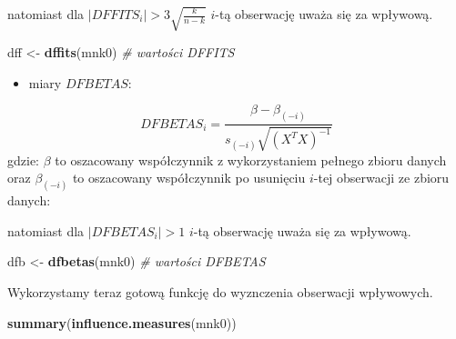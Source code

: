 \documentclass[polish,]{book}
\newenvironment{Shaded}{\begin{snugshade}}{\end{snugshade}}
\newcommand{\CommentTok}[1]{\textcolor[rgb]{0.56,0.35,0.01}{\textit{#1}}}
\newcommand{\KeywordTok}[1]{\textcolor[rgb]{0.13,0.29,0.53}{\textbf{#1}}}
\newcommand{\NormalTok}[1]{#1}
\newcommand{\OperatorTok}[1]{\textcolor[rgb]{0.81,0.36,0.00}{\textbf{#1}}}
\newcommand{\StringTok}[1]{\textcolor[rgb]{0.31,0.60,0.02}{#1}}
\providecommand{\tightlist}{%
  \setlength{\itemsep}{0pt}\setlength{\parskip}{0pt}}
\begin{document}
\begin{Shaded}
\end{Shaded}

natomiast dla \(|DFFITS_i|>3\sqrt{\frac{k}{n-k}}\) \(i\)-tą obserwację uważa się za wpływową.

\begin{Shaded}
\begin{Highlighting}[]
\NormalTok{dff <-}\StringTok{ }\KeywordTok{dffits}\NormalTok{(mnk0)  }\CommentTok{# wartości DFFITS}
\end{Highlighting}
\end{Shaded}

\begin{itemize}
\tightlist
\item
  miary \(DFBETAS\):
\end{itemize}

\begin{equation}
DFBETAS_i=\frac{\beta-\beta_{(-i)}}{s_{(-i)}\sqrt{(X^{T}X)^{-1}}}
\label{eq:wz1321}
\end{equation}
gdzie: \(\beta\) to oszacowany współczynnik z wykorzystaniem pełnego zbioru danych oraz \(\beta_{(-i)}\) to oszacowany współczynnik po usunięciu \(i\)-tej obserwacji ze zbioru danych:

\begin{Shaded}
\end{Shaded}

natomiast dla \(|DFBETAS_i|>1\) \(i\)-tą obserwację uważa się za wpływową.

\begin{Shaded}
\begin{Highlighting}[]
\NormalTok{dfb <-}\StringTok{ }\KeywordTok{dfbetas}\NormalTok{(mnk0) }\CommentTok{# wartości DFBETAS}
\end{Highlighting}
\end{Shaded}

Wykorzystamy teraz gotową funkcję do wyznczenia obserwacji wpływowych.

\begin{Shaded}
\begin{Highlighting}[]
\KeywordTok{summary}\NormalTok{(}\KeywordTok{influence.measures}\NormalTok{(mnk0))}
\end{Highlighting}
\end{Shaded}
\end{document}
